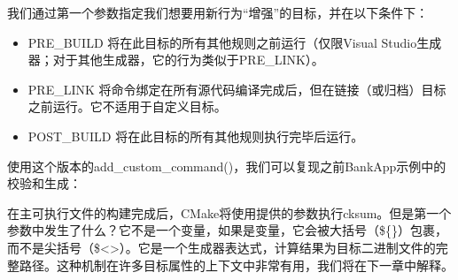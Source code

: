 我们通过第一个参数指定我们想要用新行为“增强”的目标，并在以下条件下：

\begin{itemize}
\item
PRE\_BUILD 将在此目标的所有其他规则之前运行（仅限Visual Studio生成器；对于其他生成器，它的行为类似于PRE\_LINK）。

\item
PRE\_LINK 将命令绑定在所有源代码编译完成后，但在链接（或归档）目标之前运行。它不适用于自定义目标。

\item
POST\_BUILD 将在此目标的所有其他规则执行完毕后运行。
\end{itemize}

使用这个版本的add\_custom\_command()，我们可以复现之前BankApp示例中的校验和生成：



在主可执行文件的构建完成后，CMake将使用提供的参数执行cksum。但是第一个参数中发生了什么？它不是一个变量，如果是变量，它会被大括号（\$\{\}）包裹，而不是尖括号（\$<>）。它是一个生成器表达式，计算结果为目标二进制文件的完整路径。这种机制在许多目标属性的上下文中非常有用，我们将在下一章中解释。


























